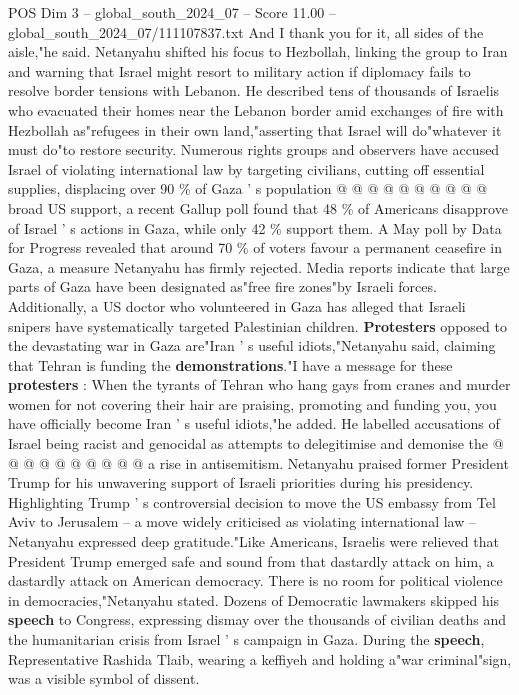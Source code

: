 \begin{textsample}{POS Dim 3 – global\_south\_2024\_07 – Score 11.00 – global\_south\_2024\_07/111107837.txt}
And I thank you for it, all sides of the aisle,"he said.
Netanyahu shifted his focus to Hezbollah, linking the group to Iran and warning that Israel might resort to military action if diplomacy fails to resolve border tensions with Lebanon.
He described tens of thousands of Israelis who evacuated their homes near the Lebanon border amid exchanges of fire with Hezbollah as"refugees in their own land,"asserting that Israel will do"whatever it must do"to restore security.
Numerous rights groups and observers have accused Israel of violating international law by targeting civilians, cutting off essential supplies, displacing over 90 \% of Gaza ' s population @ @ @ @ @ @ @ @ @ @ broad US support, a recent Gallup poll found that 48 \% of Americans disapprove of Israel ' s actions in Gaza, while only 42 \% support them.
A May poll by Data for Progress revealed that around 70 \% of voters favour a permanent ceasefire in Gaza, a measure Netanyahu has firmly rejected.
Media reports indicate that large parts of Gaza have been designated as"free fire zones"by Israeli forces.
Additionally, a US doctor who volunteered in Gaza has alleged that Israeli snipers have systematically targeted Palestinian children. \textbf{Protesters} opposed to the devastating war in Gaza are"Iran ' s useful idiots,"Netanyahu said, claiming that Tehran is funding the \textbf{demonstrations}."I have a message for these \textbf{protesters} : When the tyrants of Tehran who hang gays from cranes and murder women for not covering their hair are praising, promoting and funding you, you have officially become Iran ' s useful idiots,"he added.
He labelled accusations of Israel being racist and genocidal as attempts to delegitimise and demonise the @ @ @ @ @ @ @ @ @ @ a rise in antisemitism.
Netanyahu praised former President Trump for his unwavering support of Israeli priorities during his presidency.
Highlighting Trump ' s controversial decision to move the US embassy from Tel Aviv to Jerusalem -- a move widely criticised as violating international law -- Netanyahu expressed deep gratitude."Like Americans, Israelis were relieved that President Trump emerged safe and sound from that dastardly attack on him, a dastardly attack on American democracy.
There is no room for political violence in democracies,"Netanyahu stated.
Dozens of Democratic lawmakers skipped his \textbf{speech} to Congress, expressing dismay over the thousands of civilian deaths and the humanitarian crisis from Israel ' s campaign in Gaza.
During the \textbf{speech}, Representative Rashida Tlaib, wearing a keffiyeh and holding a"war criminal"sign, was a visible symbol of dissent.

\end{textsample}
